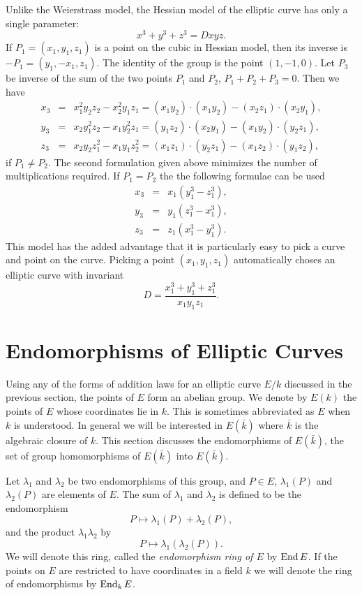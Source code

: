 Unlike the Weierstrass model, the Hessian model of the elliptic curve
has only a single parameter:
\[
x^3 + y^3 + z^3 = D x y z.
\]
If $P_1 = (x_1, y_1, z_1)$ is a point on the cubic in Hessian model, then its
inverse is $-P_1 = (y_1, -x_1, z_1)$.  The identity of the group is the
point $(1, -1, 0)$.  Let $P_3$ be inverse of the sum of the two points
$P_1$ and  $P_2$, \ie{} $P_1 + P_2 + P_3 = 0$.  Then we have
\begin{eqnarray*}
x_3 &= &x_1^2 y_2 z_2 - x_2^2 y_1 z_1
= (x_1 y_2) \cdot (x_1 y_2) - (x_2 z_1) \cdot (x_2 y_1), \\
y_3 &= &x_2 y_1^2 z_2 - x_1 y_2^2 z_1
= (y_1 z_2) \cdot (x_2 y_1) - (x_1 y_2) \cdot (y_2 z_1), \\
z_3 &= &x_2 y_2 z_1^2 - x_1 y_1 z_2^2
= (x_1 z_1) \cdot (y_2 z_1) - (x_1 z_2) \cdot (y_1 z_2),
\end{eqnarray*}
if $P_1 \not= P_2$.  The second formulation given above minimizes the
number of multiplications required.  If $P_1 = P_2$ the the following
formulae can be used
\begin{eqnarray*}
x_3 & = & x_1(y_1^3 - z_1^3), \\
y_3 & = & y_1(z_1^3 - x_1^3), \\
z_3 & = & z_1(x_1^3 - y_1^3). 
\end{eqnarray*}
This model has the added advantage that it is particularly easy to pick
a curve and point on the curve.  Picking a point $(x_1, y_1, z_1)$
automatically choses an elliptic curve with invariant 
\[
D = \frac{x_1^3 + y_1^3 + z_1^3}{x_1 y_1 z_1}.
\]

\section{Endomorphisms of Elliptic Curves}
\label{Elliptic:Endo:Sec}

Using any of the forms of addition laws for an elliptic curve $E/k$
discussed in the previous section, the points of $E$ form an abelian
group.  We denote by $E(k)$ the points of $E$ whose coordinates lie in
$k$.  This is sometimes abbreviated as $E$ when $k$ is understood.  In
general we will be interested in $E(\bar{k})$ where $\bar{k}$ is the
algebraic closure of $k$.  This section discusses the endomorphisms of
$E(\bar{k})$, \ie{} the set of group homomorphisms of $E(\bar{k})$
into $E(\bar{k})$.

Let $\lambda_1$ and $\lambda_2$ be two endomorphisms of this group,
and $P \in E$, $\lambda_1(P)$ and $\lambda_2(P)$ are elements of $E$.
The sum of $\lambda_1$ and $\lambda_2$ is defined to be the
endomorphism
\[
P \mapsto \lambda_1(P) + \lambda_2(P),
\]
and the product $\lambda_1 \lambda_2$ by
\[
P \mapsto \lambda_1 (\lambda_2(P)).
\]
We will denote this ring, called the {\em endomorphism ring of
$E$} by $\mathop{\rm End}\nolimits
E$. If the points on $E$ are restricted to have coordinates in a
field $k$ we will denote the ring of endomorphisms by $\mathop{\rm End}\nolimits_k E$.

